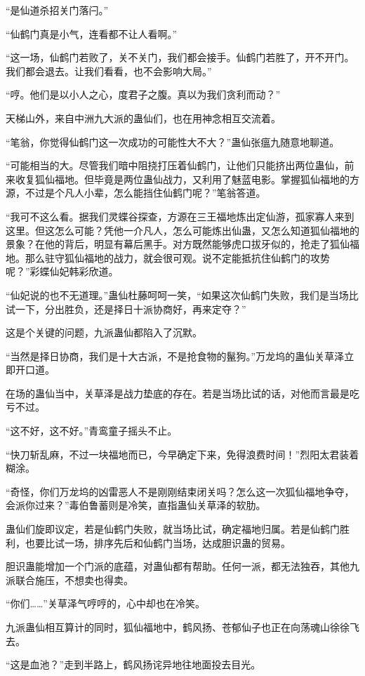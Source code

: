 \begin{this_body}
“是仙道杀招关门落闩。”

“仙鹤门真是小气，连看都不让人看啊。”

“这一场，仙鹤门若败了，关不关门，我们都会接手。仙鹤门若胜了，开不开门。我们都会退去。让我们看看，也不会影响大局。”

“哼。他们是以小人之心，度君子之腹。真以为我们贪利而动？”

天梯山外，来自中洲九大派的蛊仙们，也在用神念相互交流着。

“笔翁，你觉得仙鹤门这一次成功的可能性大不大？”蛊仙张瘟九随意地聊道。

“可能相当的大。尽管我们暗中阻挠打压着仙鹤门，让他们只能挤出两位蛊仙，前来收复狐仙福地。但毕竟是两位蛊仙战力，又利用了魅蓝电影。掌握狐仙福地的方源，不过是个凡人小辈，怎么能挡住仙鹤门呢？”笔翁答道。

“我可不这么看。据我们灵蝶谷探查，方源在三王福地炼出定仙游，孤家寡人来到这里。但这怎么可能？凭他一介凡人，怎么可能炼出仙蛊，又怎么知道狐仙福地的景象？在他的背后，明显有幕后黑手。对方既然能够虎口拔牙似的，抢走了狐仙福地。那么驻守狐仙福地的战力，就会很可观。说不定能抵抗住仙鹤门的攻势呢？”彩蝶仙妃韩彩欣道。

“仙妃说的也不无道理。”蛊仙杜藤呵呵一笑，“如果这次仙鹤门失败，我们是当场比试一下，分出胜负，还是择日十派协商好，再来定夺？”

这是个关键的问题，九派蛊仙都陷入了沉默。

“当然是择日协商，我们是十大古派，不是抢食物的鬣狗。”万龙坞的蛊仙关草泽立即开口道。

在场的蛊仙当中，关草泽是战力垫底的存在。若是当场比试的话，对他而言最是吃亏不过。

“这不好，这不好。”青鸾童子摇头不止。

“快刀斩乱麻，不过一块福地而已，今早确定下来，免得浪费时间！”烈阳太君装着糊涂。

“奇怪，你们万龙坞的凶雷恶人不是刚刚结束闭关吗？怎么这一次狐仙福地争夺，会派你过来？”毒伯鲁蓄则是冷笑，直指蛊仙关草泽的软肋。

蛊仙们旋即议定，若是仙鹤门失败，就当场比试，确定福地归属。若是仙鹤门胜利，也要比试一场，排序先后和仙鹤门当场，达成胆识蛊的贸易。

胆识蛊能增加一个门派的底蕴，对蛊仙都有帮助。任何一派，都无法独吞，其他九派联合施压，不想卖也得卖。

“你们……”关草泽气哼哼的，心中却也在冷笑。

九派蛊仙相互算计的同时，狐仙福地中，鹤风扬、苍郁仙子也正在向荡魂山徐徐飞去。

“这是血池？”走到半路上，鹤风扬诧异地往地面投去目光。


\end{this_body}
